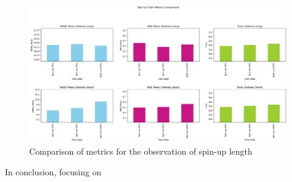 \begin{figure}[H]
    \centering
    \includegraphics[width=.8\textwidth]{figures/time_series_analysis/comparison/spin_up.png}
    \captionsetup{width=.8\textwidth}
    \caption{Comparison of metrics for the observation of spin-up length}
    \label{fig:enter-label}
\end{figure}

In conclusion, focusing on

